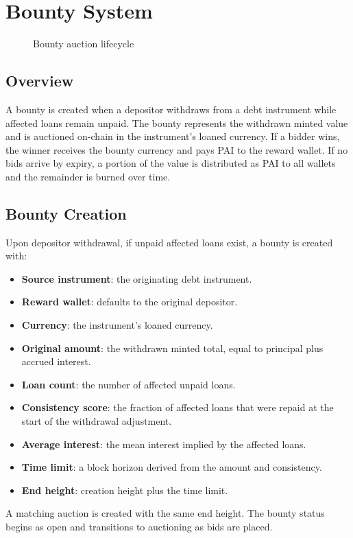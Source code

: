 \documentclass[11pt,a4paper]{article}
\begin{document}
\section{Bounty System}
\begin{figure}[H]
\centering
{}
\caption{Bounty auction lifecycle}
\label{fig:bounty}
\end{figure}

\subsection{Overview}
A bounty is created when a depositor withdraws from a debt instrument while affected loans remain unpaid. The bounty represents the withdrawn minted value and is auctioned on-chain in the instrument's loaned currency. If a bidder wins, the winner receives the bounty currency and pays PAI to the reward wallet. If no bids arrive by expiry, a portion of the value is distributed as PAI to all wallets and the remainder is burned over time.

\subsection{Bounty Creation}
Upon depositor withdrawal, if unpaid affected loans exist, a bounty is created with:
\begin{itemize}
\item \textbf{Source instrument}: the originating debt instrument.
\item \textbf{Reward wallet}: defaults to the original depositor.
\item \textbf{Currency}: the instrument's loaned currency.
\item \textbf{Original amount}: the withdrawn minted total, equal to principal plus accrued interest.
\item \textbf{Loan count}: the number of affected unpaid loans.
\item \textbf{Consistency score}: the fraction of affected loans that were repaid at the start of the withdrawal adjustment.
\item \textbf{Average interest}: the mean interest implied by the affected loans.
\item \textbf{Time limit}: a block horizon derived from the amount and consistency.
\item \textbf{End height}: creation height plus the time limit.
\end{itemize}
A matching auction is created with the same end height. The bounty status begins as open and transitions to auctioning as bids are placed.
\end{document}
